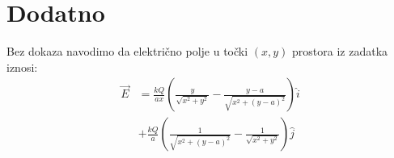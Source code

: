 \documentclass{article}
\begin{document}
\section*{Dodatno}
Bez dokaza navodimo da električno polje u točki $(x,y)$ prostora iz zadatka iznosi:
\begin{align*}
  \vec{E} & = \frac{kQ}{ax}\left(\frac{y}{\sqrt{x^2+y^2}} - \frac{y-a}{\sqrt{x^2+(y-a)^2}}\right)\hat{i} \\&+ \frac{kQ}{a}\left(\frac{1}{\sqrt{x^2+(y-a)^2}} - \frac{1}{\sqrt{x^2+y^2}}\right)\hat{j}
\end{align*}
\end{document}
